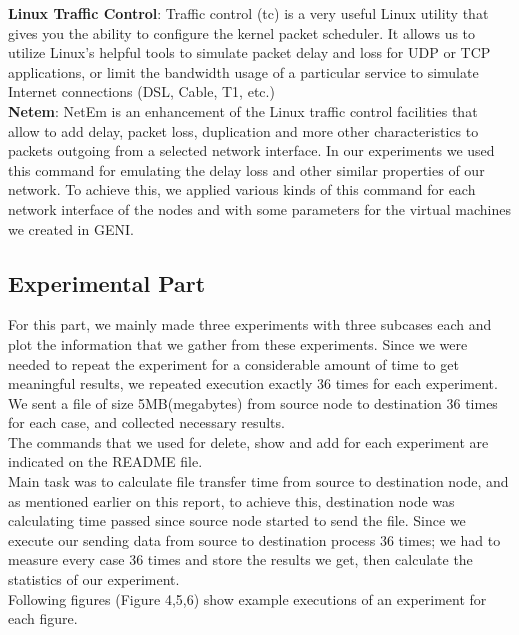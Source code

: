 \documentclass[conference]{IEEEtran}
\begin{document}
\textbf{Linux Traffic Control}:
Traffic control (tc) is a very useful Linux utility that gives you the ability to configure the kernel packet scheduler. It allows us to utilize Linux’s helpful tools to simulate packet delay and loss for UDP or TCP applications, or limit the bandwidth usage of a particular service to simulate Internet connections (DSL, Cable, T1, etc.) \\

\textbf{Netem}:
NetEm is an enhancement of the Linux traffic control facilities that allow to add delay, packet loss, duplication and more other characteristics to packets outgoing from a selected network interface. In our experiments we used this command for emulating the delay loss and other similar properties of our network. To achieve this, we applied various kinds of this command for each network interface of the nodes and with some parameters for the virtual machines we created in GENI.

\subsection{Experimental Part}
For this part, we mainly made three experiments with three subcases each and plot the information that we gather from these experiments. Since we were needed to repeat the experiment for a considerable amount of time to get meaningful results, we repeated execution exactly 36 times for each experiment. We sent a file of size 5MB(megabytes) from source node to destination 36 times for each case, and collected necessary results. \\

The commands that we used for delete, show and add for each experiment are indicated on the README file. \\

Main task was to calculate file transfer time from source to destination node, and as mentioned earlier on this report, to achieve this, destination node was calculating time passed since source node started to send the file. Since we execute our sending data from source to destination process $36$ times; we had to measure every case 36 times and store the results we get, then calculate the statistics of our experiment. \\

Following figures (Figure 4,5,6) show example executions of an experiment for each figure. 
\end{document}
